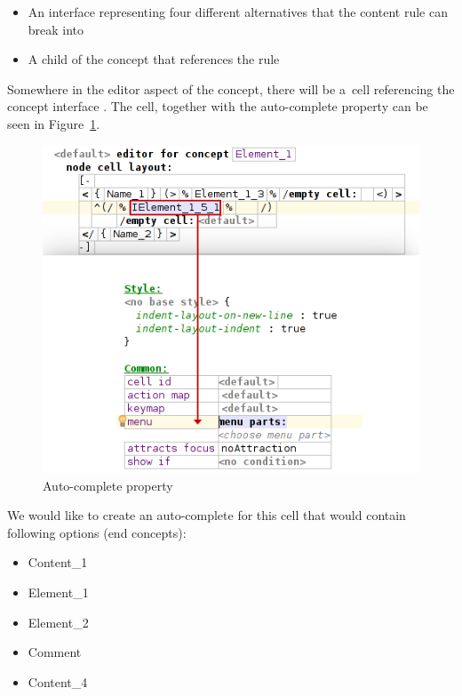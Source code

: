 \begin{itemize}
	\item An interface  representing four different alternatives that the content rule can break into

	\item A child of the  concept that references the  rule
\end{itemize}

Somewhere in the editor aspect of the  concept, there will be a~cell referencing the concept interface .
The cell, together with the auto-complete property can be seen in Figure~\ref{fig:autocomplete_cell}.
\\

\begin{figure}[h]
	\centering
	\includegraphics[scale=0.72]{./img/autocomplete_cell.png}
	\caption{Auto-complete property}
	\label{fig:autocomplete_cell}
\end{figure}

We would like to create an auto-complete for this cell that would contain following options (end concepts):

\begin{itemize}
	\itemsep0em
	\item Content{\_}1
	\item Element{\_}1
	\item Element{\_}2
	\item Comment
	\item Content{\_}4
\end{itemize}

